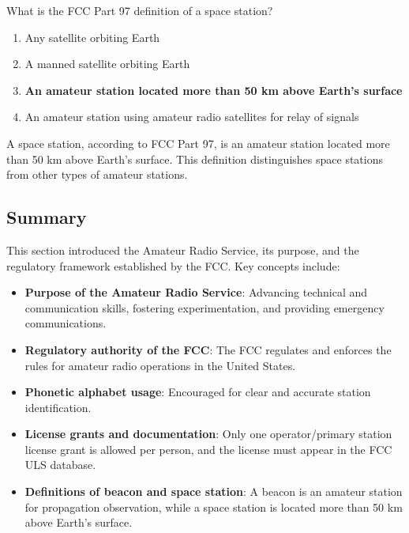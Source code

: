 \begin{tcolorbox}[colback=gray!10!white,colframe=black!75!black,title={T1A07}]
    What is the FCC Part 97 definition of a space station?
    \begin{enumerate}[label=\Alph*),noitemsep]
        \item Any satellite orbiting Earth
        \item A manned satellite orbiting Earth
        \item \textbf{An amateur station located more than 50 km above Earth's surface}
        \item An amateur station using amateur radio satellites for relay of signals
    \end{enumerate}
\end{tcolorbox}
A space station, according to FCC Part 97, is an amateur station located more than 50 km above Earth's surface. This definition distinguishes space stations from other types of amateur stations.


\subsection*{Summary}
This section introduced the Amateur Radio Service, its purpose, and the regulatory framework established by the FCC. Key concepts include:

\begin{itemize}
    \item \textbf{Purpose of the Amateur Radio Service}: Advancing technical and communication skills, fostering experimentation, and providing emergency communications.
    \item \textbf{Regulatory authority of the FCC}: The FCC regulates and enforces the rules for amateur radio operations in the United States.
    \item \textbf{Phonetic alphabet usage}: Encouraged for clear and accurate station identification.
    \item \textbf{License grants and documentation}: Only one operator/primary station license grant is allowed per person, and the license must appear in the FCC ULS database.
    \item \textbf{Definitions of beacon and space station}: A beacon is an amateur station for propagation observation, while a space station is located more than 50 km above Earth's surface.
\end{itemize}
